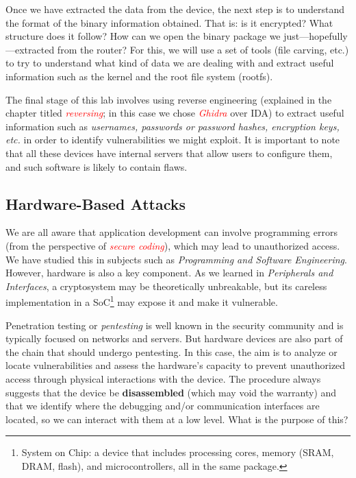 \documentclass[12pt,a4paper, brazil]{article}
\begin{document}
Once we have extracted the data from the device, the next step is to understand the format of the binary information obtained. That is: is it encrypted? What structure does it follow? How can we open the binary package we just—hopefully—extracted from the router? For this, we will use a set of tools (file carving, etc.) to try to understand what kind of data we are dealing with and extract useful information such as the kernel and the root file system (rootfs).

The final stage of this lab involves using reverse engineering (explained in the chapter titled \emph{\textcolor{red}{reversing}}; in this case we chose \emph{\textcolor{red}{Ghidra}} over IDA) to extract useful information such as \emph{usernames, passwords or password hashes, encryption keys, etc.} in order to identify vulnerabilities we might exploit. It is important to note that all these devices have internal servers that allow users to configure them, and such software is likely to contain flaws.

\subsection{Hardware-Based Attacks}

We are all aware that application development can involve programming errors (from the perspective of \emph{\textcolor{red}{secure coding}}), which may lead to unauthorized access. We have studied this in subjects such as \emph{Programming and Software Engineering}. However, hardware is also a key component. As we learned in \emph{Peripherals and Interfaces}, a cryptosystem may be theoretically unbreakable, but its careless implementation in a SoC\footnote{System on Chip: a device that includes processing cores, memory (SRAM, DRAM, flash), and microcontrollers, all in the same package.} may expose it and make it vulnerable.

Penetration testing or \emph{pentesting} is well known in the security community and is typically focused on networks and servers. But hardware devices are also part of the chain that should undergo pentesting. In this case, the aim is to analyze or locate vulnerabilities and assess the hardware’s capacity to prevent unauthorized access through physical interactions with the device. The procedure always suggests that the device be \textbf{disassembled} (which may void the warranty) and that we identify where the debugging and/or communication interfaces are located, so we can interact with them at a low level. What is the purpose of this?
\end{document}

